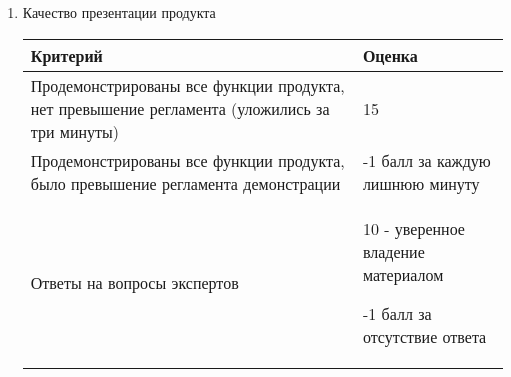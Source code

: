 \begin{enumerate}
\begin{itemize}
\begin{tabular}{|p{7cm}|l|}
        \end{tabular}
    \end{itemize}
    \item Качество презентации продукта
    \begin{tabular}{|p{7cm}|p{4cm}|}
        \hline
        Критерий & Оценка \\
        \hline
        Продемонстрированы все функции продукта, нет превышение регламента (уложились за три минуты) & 15 \\
        \hline
        Продемонстрированы все функции продукта, было превышение регламента демонстрации & -1 балл за каждую лишнюю минуту \\
        \hline
        Ответы на вопросы экспертов & 10 - уверенное владение материалом
        
        -1 балл за отсутствие ответа \\
        \hline
    \end{tabular}
\end{enumerate}
    
    